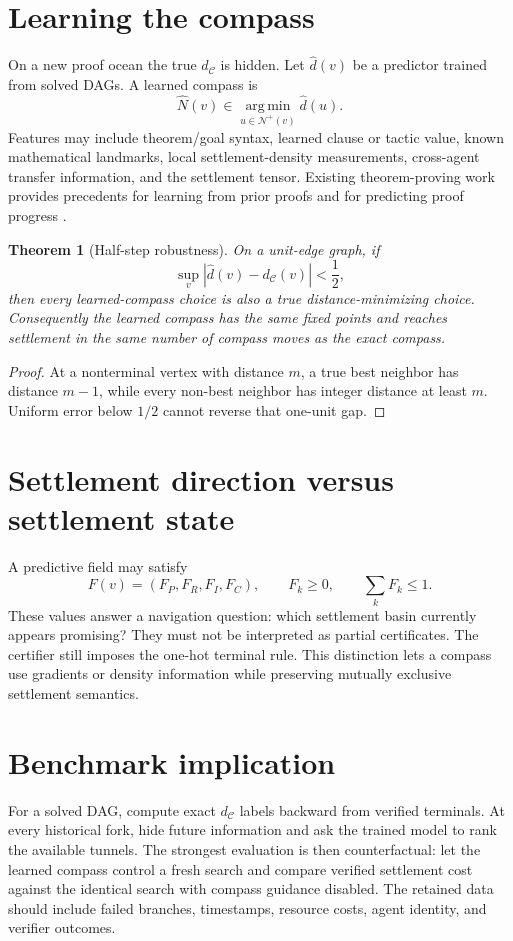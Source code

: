 \documentclass[11pt]{article}
\newtheorem{theorem}[definition]{Theorem}
\newcommand{\Cset}{\mathcal C}
\newcommand{\N}{\mathcal N}
\begin{document}
\section{Learning the compass}
On a new proof ocean the true $d_{\Cset}$ is hidden. Let $\widehat d(v)$ be a predictor trained from solved DAGs. A learned compass is
\[
\widehat N(v)\in\operatorname*{arg\,min}_{u\in\N^+(v)}\widehat d(u).
\]
Features may include theorem/goal syntax, learned clause or tactic value, known mathematical landmarks, local settlement-density measurements, cross-agent transfer information, and the settlement tensor. Existing theorem-proving work provides precedents for learning from prior proofs and for predicting proof progress \cite{goertzel2019,huang2025,crouse2019}.

\begin{theorem}[Half-step robustness]
On a unit-edge graph, if
\[
\sup_v|\widehat d(v)-d_{\Cset}(v)|<\frac12,
\]
then every learned-compass choice is also a true distance-minimizing choice. Consequently the learned compass has the same fixed points and reaches settlement in the same number of compass moves as the exact compass.
\end{theorem}
\begin{proof}
At a nonterminal vertex with distance $m$, a true best neighbor has distance $m-1$, while every non-best neighbor has integer distance at least $m$. Uniform error below $1/2$ cannot reverse that one-unit gap.
\end{proof}

\section{Settlement direction versus settlement state}
A predictive field may satisfy
\[
F(v)=(F_P,F_R,F_I,F_C),\qquad F_k\ge0,\qquad \sum_kF_k\le1.
\]
These values answer a navigation question: which settlement basin currently appears promising? They must not be interpreted as partial certificates. The certifier still imposes the one-hot terminal rule. This distinction lets a compass use gradients or density information while preserving mutually exclusive settlement semantics.

\section{Benchmark implication}
For a solved DAG, compute exact $d_{\Cset}$ labels backward from verified terminals. At every historical fork, hide future information and ask the trained model to rank the available tunnels. The strongest evaluation is then counterfactual: let the learned compass control a fresh search and compare verified settlement cost against the identical search with compass guidance disabled. The retained data should include failed branches, timestamps, resource costs, agent identity, and verifier outcomes.
\end{document}

